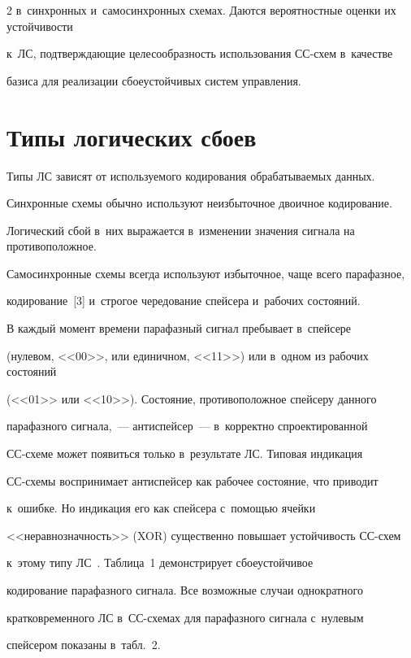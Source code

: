 \begin{multicols}{2}
в~синхронных и~самосинхронных схе\-мах. Даются вероятностные оценки их устойчивости 

к~ЛС, подтверждающие целесообразность использования СС-схем в~качестве 

базиса для реализации сбоеустойчивых систем управления.

  

\section{Типы логических сбоев}



  Типы ЛС зависят от используемого кодирования обрабатываемых данных. 

Синхронные схемы обычно используют неизбыточное двоичное кодирование. 

Логический сбой в~них выражается в~изменении значения сигнала на противоположное.  

Самосинхронные схе\-мы всегда используют избыточное, чаще всего парафазное, 

кодирование~[3] и~строгое чередование спейсера и~рабочих со\-сто\-яний. 

  

  В каждый момент времени парафазный сигнал пребывает в~спейсере 

(нулевом, <<00>>, или единичном, <<11>>) или в~одном из рабочих состояний 

(<<01>> или <<10>>). Состояние, противоположное спейсеру данного 

парафазного сигнала,~--- антиспейсер~--- в~корректно спроектированной  

СС-схе\-ме может появиться только в~результате ЛС. Типовая индикация  

СС-схе\-мы воспринимает антиспейсер как рабочее состояние, что приводит 

к~ошибке. Но индикация его как спейсера с~помощью ячейки 

<<неравнозначность>> (XOR) существенно повышает устойчивость СС-схем 

к~этому типу ЛС~\cite{4-sok}. Таблица~1 демонстрирует сбоеустойчивое 

кодирование парафазного сигнала. Все возможные случаи однократного 

кратковременного ЛС в~СС-схе\-мах для парафазного сигнала с~нулевым 

спейсером показаны в~табл.~2.








\end{multicols}
